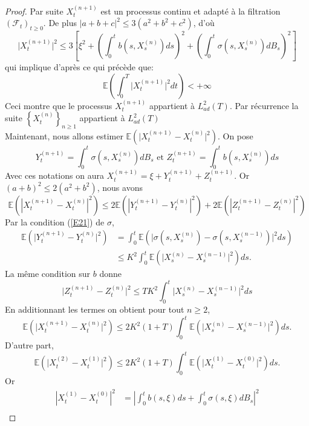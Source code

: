\documentclass[A4paper,12pt]{report}
\newcommand{\E}{{\mathbb{E}}}
\begin{document}
\begin{proof}
Par suite $X_{t}^{(n+1)}$ est un processus continu et adapté à la filtration $\left(\mathcal{F}_{t}\right)_{t \geq 0}$. De plus $|a+b+c|^{2} \leq 3\left(a^{2}+b^{2}+c^{2}\right)$, d'où
$$
\lvert X_{t}^{(n+1)}\rvert^{2} \leq 3\left[\xi^{2}+\left(\int_{0}^{t} b\left(s, X_{s}^{(n)}\right) d s\right)^{2}+\left(\int_{0}^{t} \sigma\left(s, X_{s}^{(n)}\right) d B_{s}\right)^{2}\right]
$$
qui implique d'après ce qui précède que:
$$
\E \left(\int_{0}^{T}\lvert X_{t}^{(n+1)}\rvert^{2} d t\right) <+\infty
$$
Ceci montre que le processus $X_{t}^{(n+1)}$ appartient à $L_{a d}^{2}(T)$. Par récurrence la suite $\left\{X_{t}^{(n)}\right\}_{n \geq 1}$ appartient à $L_{a d}^{2}(T)$\\
Maintenant, nous allons estimer  $\E \left( \lvert X_{t}^{(n+1)}-X_{t}^{(n)}\rvert^{2} \right)$. On pose
$$
Y_{t}^{(n+1)}=\int_{0}^{t} \sigma\left(s, X_{s}^{(n)}\right) d B_{s} \text { et } Z_{t}^{(n+1)}=\int_{0}^{t} b\left(s, X_{s}^{(n)}\right) d s
$$
Avec ces notations on aura $X_{t}^{(n+1)}=\xi+Y_{t}^{(n+1)}+Z_{t}^{(n+1)}$. Or $(a+b)^{2} \leq 2\left(a^{2}+b^{2}\right)$, nous avons
$$
\E\left(\left|X_{t}^{(n+1)}-X_{t}^{(n)}\right|^{2}\right)\leq 2 \E\left(\left|Y_{t}^{(n+1)}-Y_{t}^{(n)}\right|^{2}\right)+2 \E\left(\left|Z_{t}^{(n+1)}-Z_{t}^{(n)}\right|^{2}\right)
$$
Par la condition (\ref{E21}) de $\sigma$,
$$
\begin{aligned}
\E \left(\lvert Y_{t}^{(n+1)}-Y_{t}^{(n)}\lvert^{2}\right) & =\int_{0}^{t} \E\left(\lvert \sigma\left(s, X_{s}^{(n)}\right)-\sigma\left(s, X_{s}^{(n-1)}\right)\rvert^{2} d s \right)\\
& \leq K^{2} \int_{0}^{t} \E\left(\lvert X_{s}^{(n)}-X_{s}^{(n-1)}\rvert^{2} \right) d s .
\end{aligned}
$$
La même condition sur $b$ donne
$$
\lvert Z_{t}^{(n+1)}-Z_{t}^{(n)}\rvert^{2} \leq T K^{2} \int_{0}^{t}\lvert X_{s}^{(n)}-X_{s}^{(n-1)}\lvert^{2} d s
$$
En additionnant les termes on obtient pour tout $n \geq 2$,
\begin{equation}\label{E23}
\E\left(\lvert X_{t}^{(n+1)}-X_{t}^{(n)}\rvert^{2}\right) \leq 2 K^{2}(1+T) \int_{0}^{t} \E\left(\lvert X_{s}^{(n)}-X_{s}^{(n-1)}\rvert^{2}\right) d s .
\end{equation}
D'autre part, 
$$
\E\left(\lvert X_{t}^{(2)}-X_{t}^{(1)}\rvert^{2}\right) \leq 2 K^{2}(1+T) \int_{0}^{t}\E\left(\lvert X_{t}^{(1)}-X_{t}^{(0)}\rvert^{2}\right) d s .
$$
Or 
\begin{align*}
\left|X_{t}^{(1)}-X_{t}^{(0)}\right|^{2} &=\left|\int_{0}^{t}b(s, \xi)ds + \int_{0}^{t} \sigma(s, \xi)dB_s\right|^2\\

\end{align*}
\end{proof}
\end{document}
